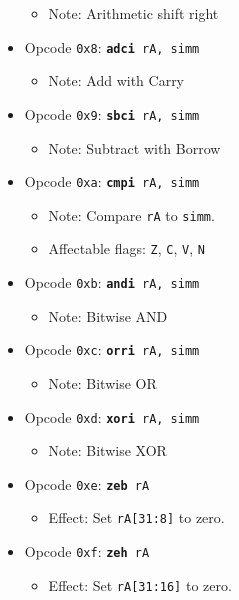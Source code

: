 \documentclass{article}
\begin{document}
\begin{itemize}
\begin{itemize}
			\item Note:  Arithmetic shift right
		\end{itemize}
		\item Opcode \texttt{0x8}:
			\texttt{\textbf{adci} rA, simm}
		\begin{itemize}
			\item Note:  Add with Carry
		\end{itemize}
		\item Opcode \texttt{0x9}:
			\texttt{\textbf{sbci} rA, simm}
		\begin{itemize}
			\item Note:  Subtract with Borrow
		\end{itemize}
		\item Opcode \texttt{0xa}:
			\texttt{\textbf{cmpi} rA, simm}
		\begin{itemize}
			\item Note:  Compare \texttt{rA} to \texttt{simm}.
			\item Affectable flags:
				\texttt{Z}, \texttt{C}, \texttt{V}, \texttt{N}
		\end{itemize}
		\item Opcode \texttt{0xb}:
			\texttt{\textbf{andi} rA, simm}
		\begin{itemize}
			\item Note:  Bitwise AND
		\end{itemize}
		\item Opcode \texttt{0xc}:
			\texttt{\textbf{orri} rA, simm}
		\begin{itemize}
			\item Note:  Bitwise OR
		\end{itemize}
		\item Opcode \texttt{0xd}:
			\texttt{\textbf{xori} rA, simm}
		\begin{itemize}
			\item Note:  Bitwise XOR
		\end{itemize}
		\item Opcode \texttt{0xe}:
			\texttt{\textbf{zeb} rA}
		\begin{itemize}
			\item Effect:  Set \texttt{rA[31:8]} to zero.
		\end{itemize}
		\item Opcode \texttt{0xf}:
			\texttt{\textbf{zeh} rA}
		\begin{itemize}
			\item Effect:  Set \texttt{rA[31:16]} to zero.
		\end{itemize}
	\end{itemize}
\end{document}
